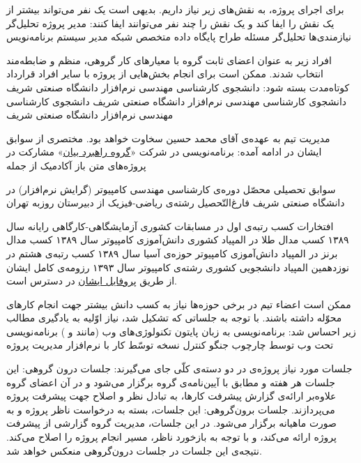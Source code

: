 برای اجرای پروژه، به نقش‌های زیر نیاز داریم. بدیهی است یک نفر می‌تواند بیشتر از یک نقش را ایفا کند و یک نقش را چند نفر می‌توانند ایفا کنند:
 مدیر پروژه
 تحلیل‌گر نیازمندی‌ها
 تحلیل‌گر مسئله
 طراح پایگاه داده
 متخصص شبکه
 مدیر سیستم
 برنامه‌نویس

افراد زیر به عنوان اعضای ثابت گروه با معیارهای کار گروهی، منظم و ضابطه‌مند انتخاب شدند. ممکن است برای انجام بخش‌هایی از پروژه با سایر افراد قرارداد کوتاه‌مدت بسته شود:
 دانشجوی کارشناسی مهندسی نرم‌افزار دانشگاه صنعتی شریف
 دانشجوی کارشناسی مهندسی نرم‌افزار دانشگاه صنعتی شریف
 دانشجوی کارشناسی مهندسی نرم‌افزار دانشگاه صنعتی شریف

مدیریت تیم به عهده‌ی آقای محمد حسین سخاوت خواهد بود. مختصری از سوابق ایشان در ادامه آمده:
 برنامه‌نویسی در شرکت «\href{http://bayan.co.ir/}{گروه راهبرد بیان}» 
 مشارکت در پروژه‌های متن باز آکادمیک از جمله 

 سوابق تحصیلی
 محصّل دوره‌ی کارشناسی مهندسی کامپیوتر (گرایش نرم‌افزار) در دانشگاه صنعتی شریف
 فارغ‌التّحصیل رشته‌ی ریاضی-فیزیک از دبیرستان روزبه تهران

 افتخارات
 کسب رتبه‌ی اول در مسابقات کشوری آزمایشگاهی-کارگاهی رایانه سال ۱۳۸۹
 کسب مدال طلا در المپیاد کشوری دانش‌آموزی کامپیوتر سال ۱۳۸۹
 کسب مدال برنز در المپیاد دانش‌آموزی کامپیوتر حوزه‌ی آسیا سال ۱۳۸۹
 کسب رتبه‌ی هشتم در نوزدهمین المپیاد دانشجویی کشوری رشته‌ی کامپیوتر سال ۱۳۹۳
رزومه‌ی کامل ایشان از طریق \href{https://www.linkedin.com/profile/view?id=159934426}{پروفایل  ایشان} در دسترس است.


ممکن است اعضاء تیم در برخی حوزه‌ها نیاز به کسب دانش بیشتر جهت انجام کارهای محوّله داشته باشند. با توجه به جلساتی که تشکیل شد، نیاز اوّلیه به یادگیری مطالب زیر احساس شد:
 برنامه‌نویسی به زبان پایتون
 تکنولوژی‌های وب (مانند  و )
 برنامه‌نویسی تحت وب توسط چارچوب جنگو
 کنترل نسخه توسّط 
 کار با نرم‌افزار مدیریت پروژه 

جلسات مورد نیاز پروژه‌ی \PRJN{} در دو دسته‌ی کلّی جای می‌گیرند:
 جلسات درون گروهی: این جلسات هر هفته و مطابق با آیین‌نامه‌ی گروه برگزار می‌شود و در آن اعضای گروه علاوه‌بر ارائه‌ی گزارش پیشرفت کارها، به تبادل نظر و اصلاح جهت پیشرفت پروژه می‌پردازند.
 جلسات برون‌گروهی: این جلسات، بسته به درخواست ناظر پروژه و به صورت ماهیانه برگزار می‌شود. در این جلسات، مدیریت گروه گزارشی از پیشرفت پروژه ارائه می‌کند، و با توجه به بازخورد ناظر، مسیر انجام پروژه را اصلاح می‌کند. نتیجه‌ی این جلسات در جلسات درون‌گروهی منعکس خواهد شد.


